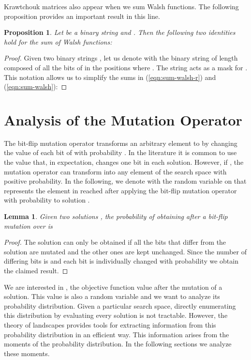 \documentclass{article}
\newtheorem{lemma}{Lemma}
\newtheorem{proposition}{Proposition}
\begin{document}
Krawtchouk matrices also appear when we sum Walsh functions. The following proposition provides an important result in this line.
\begin{proposition}
\label{prop:krawtchouk}
Let  be a binary string and . Then the following two identities hold for the sum of Walsh functions:

\end{proposition}
\begin{proof}
Given two binary strings , let us denote with  the binary string of length  composed of all the bits of  in the positions  where . The string  acts as a mask for . This notation allows us to simplify the sums in (\ref{eqn:sum-walsh-r}) and (\ref{eqn:sum-walsh}):



\end{proof}





\section{Analysis of the Mutation Operator}
\label{sec:mutation}

The bit-flip mutation operator transforms an arbitrary element  to  by changing the value of each bit of  with probability . In the literature it is common to use the value  that, in expectation, changes one bit in each solution. However, if , the mutation operator can transform  into any element of the search space with positive probability. In the following, we denote with  the random variable on  that represents the element in  reached after applying the bit-flip mutation operator with probability  to solution .

\begin{lemma}
\label{lem:prob-mut}
Given two solutions , the probability of obtaining  after a bit-flip mutation over  is

\end{lemma}
\begin{proof}
The solution  can only be obtained if all the bits that differ from the solution  are mutated and the other ones are kept unchanged. Since the number of differing bits is  and each bit is individually changed with probability  we obtain the claimed result.
\end{proof}

We are interested in , the objective function value after the mutation of a solution. This value is also a random variable and we want to analyze its probability distribution. 
Given a particular search space, directly enumerating this distribution by evaluating every solution is not tractable. However, the theory of landscapes provides tools for extracting information from this probability distribution in an efficient way. This information arises from the moments of the probability distribution. In the following sections we analyze these moments.
\end{document}
